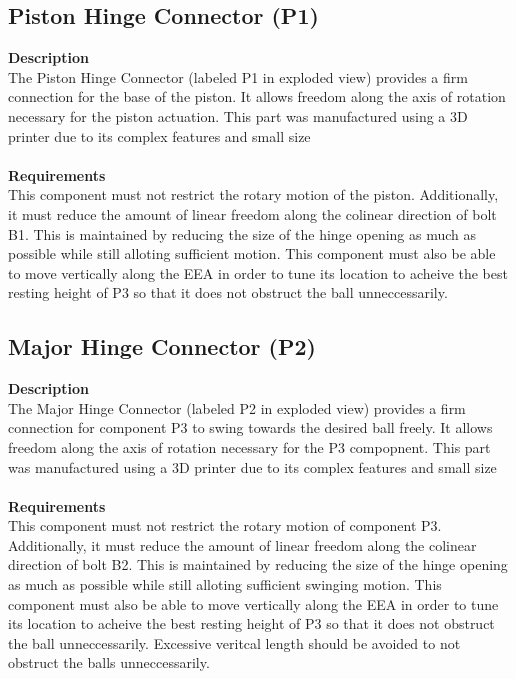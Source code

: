 \documentclass[titlepage]{article}
\begin{document}
\begin{center}
\begin{center}
\begin{center}
\begin{center}
\begin{center}
\begin{center}
\begin{center}
\begin{center}
\begin{center}
\begin{center}
\begin{center}
\begin{center}
\begin{center}
\subsection{Piston Hinge Connector (P1)}
\textbf{Description}\\
The Piston Hinge Connector (labeled P1 in exploded view) provides a firm connection for the base of the piston. It allows freedom along the axis of rotation necessary for the piston actuation. This part was manufactured using a 3D printer due to its complex features and small size\\\\
\textbf{Requirements}\\
This component must not restrict the rotary motion of the piston. Additionally, it must reduce the amount of linear freedom along the colinear direction of bolt B1. This is maintained by reducing the size of the hinge opening as much as possible while still alloting sufficient motion. This component must also be able to move vertically along the EEA in order to tune its location to acheive the best resting height of P3 so that it does not obstruct the ball unneccessarily.
\begin{center}

\subsection{Major Hinge Connector (P2)}
\textbf{Description}\\
The Major Hinge Connector (labeled P2 in exploded view) provides a firm connection for component P3 to swing towards the desired ball freely. It allows freedom along the axis of rotation necessary for the P3 compopnent. This part was manufactured using a 3D printer due to its complex features and small size\\\\
\textbf{Requirements}\\
This component must not restrict the rotary motion of component P3. Additionally, it must reduce the amount of linear freedom along the colinear direction of bolt B2. This is maintained by reducing the size of the hinge opening as much as possible while still alloting sufficient swinging motion. This component must also be able to move vertically along the EEA in order to tune its location to acheive the best resting height of P3 so that it does not obstruct the ball unneccessarily. Excessive veritcal length should be avoided to not obstruct the balls unneccessarily.



\end{center}
\end{center}
\end{center}
\end{center}
\end{center}
\end{center}
\end{center}
\end{center}
\end{center}
\end{center}
\end{center}
\end{center}
\end{center}
\end{center}
\end{document}
